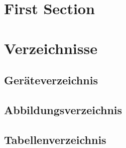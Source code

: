 \section{First Section}     %

\blindtext

\newpage                    %
\section{Verzeichnisse}

\subsection{Geräteverzeichnis}

\subsection{Abbildungsverzeichnis}
\listoffigures

\subsection{Tabellenverzeichnis}
\listoftables               %